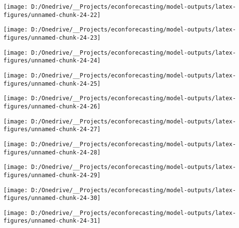 \documentclass[11pt, letterpaper]{article}\usepackage[]{graphicx}\usepackage[]{color}
\begin{document}
{\centering \texttt{[image: D:/Onedrive/\_\_Projects/econforecasting/model-outputs/latex-figures/unnamed-chunk-24-22]} 

}




{\centering \texttt{[image: D:/Onedrive/\_\_Projects/econforecasting/model-outputs/latex-figures/unnamed-chunk-24-23]} 

}




{\centering \texttt{[image: D:/Onedrive/\_\_Projects/econforecasting/model-outputs/latex-figures/unnamed-chunk-24-24]} 

}




{\centering \texttt{[image: D:/Onedrive/\_\_Projects/econforecasting/model-outputs/latex-figures/unnamed-chunk-24-25]} 

}




{\centering \texttt{[image: D:/Onedrive/\_\_Projects/econforecasting/model-outputs/latex-figures/unnamed-chunk-24-26]} 

}




{\centering \texttt{[image: D:/Onedrive/\_\_Projects/econforecasting/model-outputs/latex-figures/unnamed-chunk-24-27]} 

}




{\centering \texttt{[image: D:/Onedrive/\_\_Projects/econforecasting/model-outputs/latex-figures/unnamed-chunk-24-28]} 

}




{\centering \texttt{[image: D:/Onedrive/\_\_Projects/econforecasting/model-outputs/latex-figures/unnamed-chunk-24-29]} 

}




{\centering \texttt{[image: D:/Onedrive/\_\_Projects/econforecasting/model-outputs/latex-figures/unnamed-chunk-24-30]} 

}




{\centering \texttt{[image: D:/Onedrive/\_\_Projects/econforecasting/model-outputs/latex-figures/unnamed-chunk-24-31]} 

}
\end{document}
